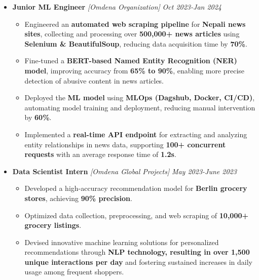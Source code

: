 \documentclass[a4paper,10pt]{article}
\begin{document}
\begin{itemize}
\vspace{-1mm}
\item {\bf Junior ML Engineer } \textit{[Omdena Organization]}
\textit{\hfill {Oct 2023-Jan 2024}}
\vspace{-1mm}
\begin{itemize}
\item Engineered an \textbf{automated web scraping pipeline} for \textbf{Nepali news sites}, collecting and processing over \textbf{500,000+ news articles} using \textbf{Selenium \& BeautifulSoup}, reducing data acquisition time by \textbf{70\%}.
\item Fine-tuned a \textbf{BERT-based Named Entity Recognition (NER) model}, improving accuracy from \textbf{65\% to 90\%}, enabling more precise detection of abusive content in news articles.
\item Deployed the \textbf{ML model} using \textbf{MLOps (Dagshub, Docker, CI/CD)}, automating model training and deployment, reducing manual intervention by \textbf{60\%}.
\item Implemented a \textbf{real-time API endpoint} for extracting and analyzing entity relationships in news data, supporting \textbf{100+ concurrent requests} with an average response time of \textbf{1.2s}.
\vspace{-1mm}
\end{itemize}
\end{itemize}

\begin{itemize}
\vspace{-0.5mm}
\item {\bf Data Scientist Intern } \textit{[Omdena Global Projects]}
\textit{\hfill {May 2023-June 2023}}
\vspace{-1mm}
\begin{itemize}
\item Developed a high-accuracy recommendation model for \textbf{Berlin grocery stores}, achieving \textbf{90\% precision}.
\item Optimized data collection, preprocessing, and web scraping of \textbf{10,000+ grocery listings}.
\item Devised innovative machine learning solutions for personalized recommendations through \textbf{NLP technology, resulting in over 1,500 unique interactions per day} and fostering sustained increases in daily usage among frequent shoppers.
\vspace{-1mm}
\end{itemize}
\end{itemize}
\end{document}
